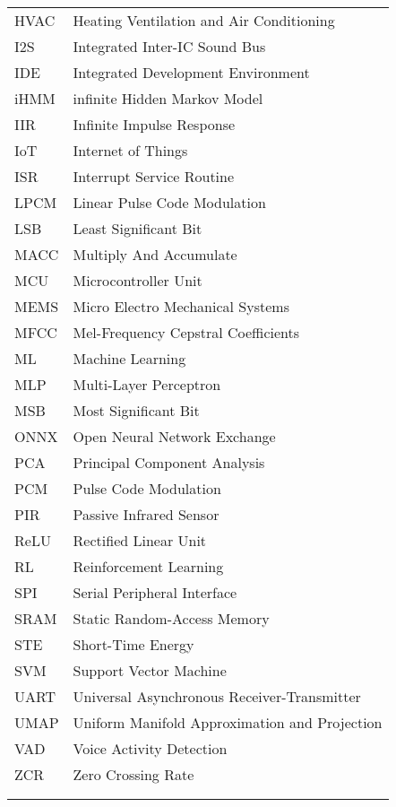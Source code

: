 \begin{longtable}{@{}p{}p{}@{}}
HVAC            &       Heating Ventilation and Air Conditioning   \\
I2S             &       Integrated Inter-IC Sound Bus  \\
IDE             &       Integrated Development Environment  \\
iHMM            &       infinite Hidden Markov Model   \\
IIR             &       Infinite Impulse Response     \\
IoT             &       Internet of Things  \\
ISR             &       Interrupt Service Routine     \\
LPCM            &       Linear Pulse Code Modulation   \\
LSB             &       Least Significant Bit     \\
MACC            &       Multiply And Accumulate      \\
MCU             &       Microcontroller Unit  \\
MEMS            &       Micro Electro Mechanical Systems   \\
MFCC            &       Mel-Frequency Cepstral Coefficients   \\
ML              &       Machine Learning \\
MLP             &       Multi-Layer Perceptron  \\
MSB             &       Most Significant Bit     \\
ONNX            &       Open Neural Network Exchange   \\
PCA             &       Principal Component Analysis  \\
PCM             &       Pulse Code Modulation  \\
PIR             &       Passive Infrared Sensor  \\
ReLU            &       Rectified Linear Unit   \\
RL              &       Reinforcement Learning \\
SPI             &       Serial Peripheral Interface     \\
SRAM            &       Static Random-Access Memory      \\
STE             &       Short-Time Energy  \\
SVM             &       Support Vector Machine  \\
UART            &       Universal Asynchronous Receiver-Transmitter   \\
UMAP            &       Uniform Manifold Approximation and Projection   \\
VAD             &       Voice Activity Detection  \\
ZCR             &       Zero Crossing Rate  \\
                &         \\
                &         \\



\end{longtable}
